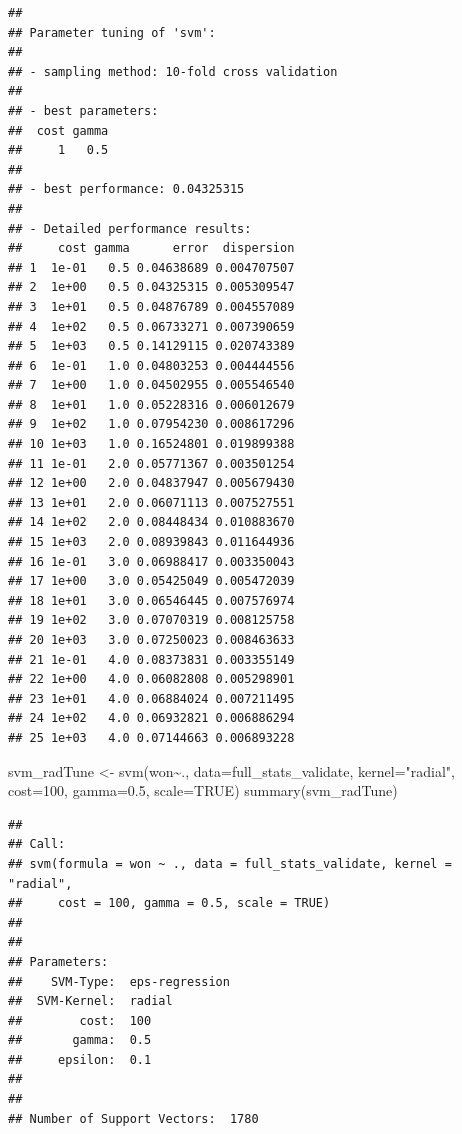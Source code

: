 \documentclass[
]{article}
\newenvironment{Shaded}{\begin{snugshade}}{\end{snugshade}}
\newcommand{\AttributeTok}[1]{\textcolor[rgb]{0.77,0.63,0.00}{#1}}
\newcommand{\ConstantTok}[1]{\textcolor[rgb]{0.00,0.00,0.00}{#1}}
\newcommand{\DecValTok}[1]{\textcolor[rgb]{0.00,0.00,0.81}{#1}}
\newcommand{\FloatTok}[1]{\textcolor[rgb]{0.00,0.00,0.81}{#1}}
\newcommand{\FunctionTok}[1]{\textcolor[rgb]{0.00,0.00,0.00}{#1}}
\newcommand{\NormalTok}[1]{#1}
\newcommand{\OtherTok}[1]{\textcolor[rgb]{0.56,0.35,0.01}{#1}}
\newcommand{\SpecialCharTok}[1]{\textcolor[rgb]{0.00,0.00,0.00}{#1}}
\newcommand{\StringTok}[1]{\textcolor[rgb]{0.31,0.60,0.02}{#1}}
\begin{document}
\begin{verbatim}
## 
## Parameter tuning of 'svm':
## 
## - sampling method: 10-fold cross validation 
## 
## - best parameters:
##  cost gamma
##     1   0.5
## 
## - best performance: 0.04325315 
## 
## - Detailed performance results:
##     cost gamma      error  dispersion
## 1  1e-01   0.5 0.04638689 0.004707507
## 2  1e+00   0.5 0.04325315 0.005309547
## 3  1e+01   0.5 0.04876789 0.004557089
## 4  1e+02   0.5 0.06733271 0.007390659
## 5  1e+03   0.5 0.14129115 0.020743389
## 6  1e-01   1.0 0.04803253 0.004444556
## 7  1e+00   1.0 0.04502955 0.005546540
## 8  1e+01   1.0 0.05228316 0.006012679
## 9  1e+02   1.0 0.07954230 0.008617296
## 10 1e+03   1.0 0.16524801 0.019899388
## 11 1e-01   2.0 0.05771367 0.003501254
## 12 1e+00   2.0 0.04837947 0.005679430
## 13 1e+01   2.0 0.06071113 0.007527551
## 14 1e+02   2.0 0.08448434 0.010883670
## 15 1e+03   2.0 0.08939843 0.011644936
## 16 1e-01   3.0 0.06988417 0.003350043
## 17 1e+00   3.0 0.05425049 0.005472039
## 18 1e+01   3.0 0.06546445 0.007576974
## 19 1e+02   3.0 0.07070319 0.008125758
## 20 1e+03   3.0 0.07250023 0.008463633
## 21 1e-01   4.0 0.08373831 0.003355149
## 22 1e+00   4.0 0.06082808 0.005298901
## 23 1e+01   4.0 0.06884024 0.007211495
## 24 1e+02   4.0 0.06932821 0.006886294
## 25 1e+03   4.0 0.07144663 0.006893228
\end{verbatim}

\begin{Shaded}
\begin{Highlighting}[]
\NormalTok{svm\_radTune }\OtherTok{\textless{}{-}} \FunctionTok{svm}\NormalTok{(won}\SpecialCharTok{\textasciitilde{}}\NormalTok{., }\AttributeTok{data=}\NormalTok{full\_stats\_validate, }\AttributeTok{kernel=}\StringTok{"radial"}\NormalTok{, }\AttributeTok{cost=}\DecValTok{100}\NormalTok{, }\AttributeTok{gamma=}\FloatTok{0.5}\NormalTok{, }\AttributeTok{scale=}\ConstantTok{TRUE}\NormalTok{)}
\FunctionTok{summary}\NormalTok{(svm\_radTune)}
\end{Highlighting}
\end{Shaded}

\begin{verbatim}
## 
## Call:
## svm(formula = won ~ ., data = full_stats_validate, kernel = "radial", 
##     cost = 100, gamma = 0.5, scale = TRUE)
## 
## 
## Parameters:
##    SVM-Type:  eps-regression 
##  SVM-Kernel:  radial 
##        cost:  100 
##       gamma:  0.5 
##     epsilon:  0.1 
## 
## 
## Number of Support Vectors:  1780
\end{verbatim}
\end{document}
